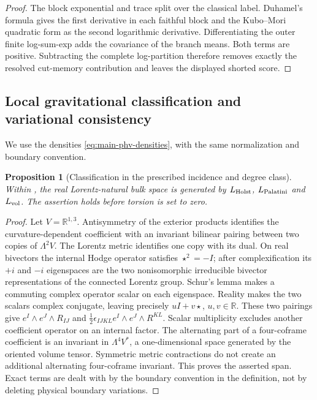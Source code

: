 \documentclass[11pt]{article}
\numberwithin{equation}{section}
\newtheorem{proposition}[proposition]{Proposition}
\theoremstyle{definition}
\theoremstyle{remark}
\begin{document}
\begin{proof}
The block exponential and trace split over the classical label.  Duhamel's
formula gives the first derivative in each faithful block and the Kubo--Mori
quadratic form as the second logarithmic derivative.  Differentiating the outer
finite log-sum-exp adds the covariance of the branch means.  Both terms are
positive.  Subtracting the complete log-partition therefore removes exactly the
resolved cut-memory contribution and leaves the displayed shorted score.
\end{proof}

\subsection{Local gravitational classification and variational consistency}

We use the densities \eqref{eq:main-phv-densities}, with the same
normalization and boundary convention.

\begin{proposition}[Classification in the prescribed incidence and degree class]
\label{prop:supp-restricted-classification}
Within , the real Lorentz-natural bulk
space is generated by $L_{\rm Holst}$, $L_{\rm Palatini}$ and $L_{\rm vol}$.
The assertion holds before torsion is set to zero.
\end{proposition}
\begin{proof}
Let $V=\mathbb R^{1,3}$. Antisymmetry of the exterior products identifies
the curvature-dependent coefficient with an invariant bilinear pairing
between two copies of $\Lambda^2 V$. The Lorentz metric identifies one copy
with its dual. On real bivectors the internal Hodge operator satisfies
$\star^2=-I$; after complexification its $+i$ and $-i$ eigenspaces are the
two nonisomorphic irreducible bivector representations of the connected
Lorentz group. Schur's lemma makes a commuting complex operator scalar on
each eigenspace. Reality makes the two scalars complex conjugate, leaving
precisely $uI+v\star$, $u,v\in\mathbb R$. These two pairings give
$e^I\wedge e^J\wedge R_{IJ}$ and
$\tfrac12\epsilon_{IJKL}e^I\wedge e^J\wedge R^{KL}$.
Scalar multiplicity excludes another coefficient operator on an internal
factor. The alternating part of a four-coframe coefficient is an invariant
in $\Lambda^4 V^*$, a one-dimensional space generated by the oriented
volume tensor. Symmetric metric contractions do not create an additional
alternating four-coframe invariant. This proves the asserted span. Exact
terms are dealt with by the boundary convention in the definition, not by
deleting physical boundary variations.
\end{proof}
\end{document}
